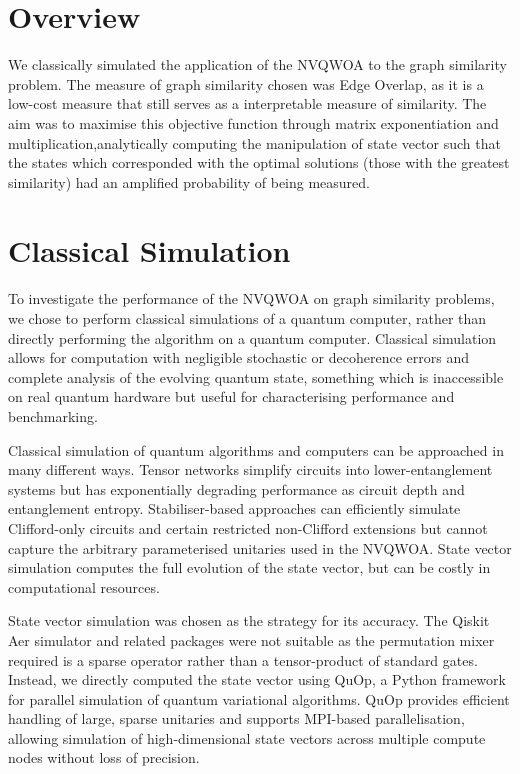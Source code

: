 \section{Overview}
We classically simulated the application of the NVQWOA to the graph similarity problem. The measure of graph similarity chosen was Edge Overlap, as it is a low-cost measure that still serves as a interpretable measure of similarity. The aim was to maximise this objective function through matrix exponentiation and multiplication,analytically computing the manipulation of state vector such that the states which corresponded with the optimal solutions (those with the greatest similarity) had an amplified probability of being measured.

\section{Classical Simulation}
To investigate the performance of the NVQWOA on graph similarity problems, we chose to perform classical simulations of a quantum computer, rather than directly performing the algorithm on a quantum computer. Classical simulation allows for computation with negligible stochastic or decoherence errors and complete analysis of the evolving quantum state, something which is inaccessible on real quantum hardware but useful for characterising performance and benchmarking.

Classical simulation of quantum algorithms and computers can be approached in many different ways. Tensor networks simplify circuits into lower-entanglement systems but has exponentially degrading performance as circuit depth and entanglement entropy. Stabiliser-based approaches can efficiently simulate Clifford-only circuits and certain restricted non-Clifford extensions but cannot capture the arbitrary parameterised unitaries used in the NVQWOA. State vector simulation computes the full evolution of the state vector, but can be costly in computational resources.

State vector simulation was chosen as the strategy for its accuracy. The Qiskit Aer simulator and related packages were not suitable as the permutation mixer required is a sparse operator rather than a tensor-product of standard gates. Instead, we directly computed the state vector using QuOp, a Python framework for parallel simulation of quantum variational algorithms\cite{QuOp_MPI_paper_variational,QuOp_MPI}. QuOp provides efficient handling of large, sparse unitaries and supports MPI-based parallelisation, allowing simulation of high-dimensional state vectors across multiple compute nodes without loss of precision.

